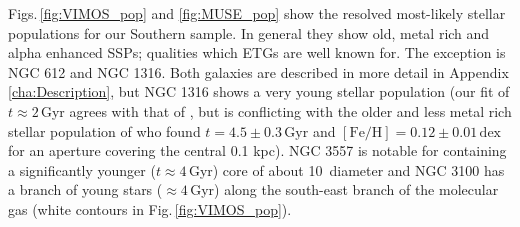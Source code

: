 		Figs.\,\ref{fig:VIMOS_pop} and \ref{fig:MUSE_pop} show the resolved most-likely stellar populations for our Southern sample. In general they show old, metal rich and alpha enhanced SSPs; qualities which ETGs are well known for. The exception is NGC 612 and NGC 1316. Both galaxies are described in more detail in Appendix \ref{cha:Description}, but NGC 1316 shows a very young stellar population (our fit of $t \approx 2$\,Gyr agrees with that of \citealt{Kuntschner2000}, but is conflicting with the older and less metal rich stellar population of \citealt{Koleva2011} who found $t=4.5 \pm 0.3 \,\mathrm{Gyr}$ and $\mathrm{[Fe/H]}=0.12 \pm 0.01 \,\mathrm{dex}$ for an aperture covering the central 0.1 kpc). NGC 3557 is notable for containing a significantly younger ($t\approx 4$\,Gyr) core of about 10\arcsec\ diameter and NGC 3100 has a branch of young stars ($\approx 4$\,Gyr) along the south-east branch of the molecular gas (white contours in Fig.\,\ref{fig:VIMOS_pop}).

